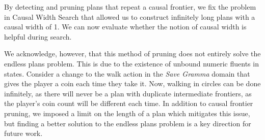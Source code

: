 \documentclass[letterpaper]{article} %
\begin{document}
By detecting and pruning plans that repeat a causal frontier, we fix the problem in Causal Width Search that allowed us to construct infinitely long plans with a causal width of 1. We can now evaluate whether the notion of causal width is helpful during search.

We acknowledge, however, that this method of pruning does not entirely solve the endless plans problem. This is due to the existence of unbound numeric fluents in states. Consider a change to the walk action in the \textit{Save Gramma} domain that gives the player a coin each time they take it. Now, walking in circles can be done infinitely, as there will never be a plan with duplicate intermediate frontiers, as the player's coin count will be different each time. In addition to causal frontier pruning, we imposed a limit on the length of a plan which mitigates this issue, but finding a better solution to the endless plans problem is a key direction for future work.
\end{document}

